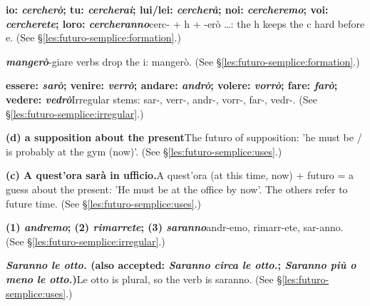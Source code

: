 \documentclass[11pt,a4paper,twoside,openright]{book}
\newcommand{\answerheading}[1]{\par\medskip\noindent{\sffamily\bfseries\small #1}\par\nopagebreak}
\begin{document}
\answerheading{\S\ref{les:futuro-semplice} Futuro semplice}\label{ans:futuro-semplice}
\begin{answers}
\item\relax \textbf{io: \textit{cercherò}; tu: \textit{cercherai}; lui/lei: \textit{cercherà}; noi: \textit{cercheremo}; voi: \textit{cercherete}; loro: \textit{cercheranno}}\newline cerc- + h + -erò …: the h keeps the c hard before e. {\color{muted}(See \S\ref{les:futuro-semplice:formation}.)}
\item\relax \textbf{\textit{mangerò}}\newline -giare verbs drop the i: mangerò. {\color{muted}(See \S\ref{les:futuro-semplice:formation}.)}
\item\relax \textbf{essere: \textit{sarò}; venire: \textit{verrò}; andare: \textit{andrò}; volere: \textit{vorrò}; fare: \textit{farò}; vedere: \textit{vedrò}}\newline Irregular stems: sar-, verr-, andr-, vorr-, far-, vedr-. {\color{muted}(See \S\ref{les:futuro-semplice:irregular}.)}
\item\relax \textbf{(d) a supposition about the present}\newline The futuro of supposition: 'he must be / is probably at the gym (now)'. {\color{muted}(See \S\ref{les:futuro-semplice:uses}.)}
\item\relax \textbf{(c) A quest'ora sarà in ufficio.}\newline A quest'ora (at this time, now) + futuro = a guess about the present: 'He must be at the office by now'. The others refer to future time. {\color{muted}(See \S\ref{les:futuro-semplice:uses}.)}
\item\relax \textbf{(1) \textit{andremo}; (2) \textit{rimarrete}; (3) \textit{saranno}}\newline andr-emo, rimarr-ete, sar-anno. {\color{muted}(See \S\ref{les:futuro-semplice:irregular}.)}
\item\relax \textbf{\textit{Saranno le otto.} {\color{muted}(also accepted: \textit{Saranno circa le otto.}; \textit{Saranno più o meno le otto.})}}\newline Le otto is plural, so the verb is saranno. {\color{muted}(See \S\ref{les:futuro-semplice:uses}.)}
\end{answers}
\end{document}
